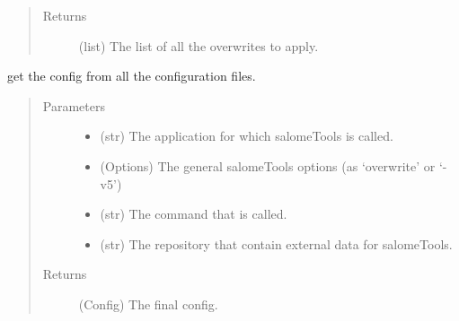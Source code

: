 \documentclass[a4paper,10pt,english]{sphinxmanual}
\begin{document}
\begin{fulllineitems}
\begin{fulllineitems}
\begin{quote}
\begin{description}
\begin{itemize}
\end{itemize}

\item[{Returns}] \leavevmode
(list) The list of all the overwrites to apply.

\end{description}\end{quote}

\end{fulllineitems}


\begin{fulllineitems}
\label{\detokenize{apidoc_src/src:src.configManager.ConfigManager.get_config}}
get the config from all the configuration files.
\begin{quote}\begin{description}
\item[{Parameters}] \leavevmode\begin{itemize}
\item {} 
 \textendash{} (str) 
The application for which salomeTools is called.

\item {} 
 \textendash{} (Options) 
The general salomeTools options 
(as ‘\textendash{}overwrite’ or ‘-v5’)

\item {} 
 \textendash{} (str) The command that is called.

\item {} 
 \textendash{} (str) 
The repository that contain external data for salomeTools.

\end{itemize}

\item[{Returns}] \leavevmode
(Config) The final config.

\end{description}\end{quote}

\end{fulllineitems}



\end{fulllineitems}
\end{document}
